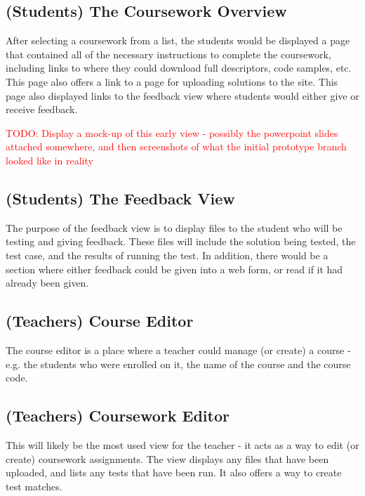 \documentclass[a4paper,11pt]{report}
\newcommand{\todo}[1]{\textcolor{red}{TODO: #1}}
\begin{document}
\subsection{(Students) The Coursework Overview}
After selecting a coursework from a list, the students would be displayed a page that contained all of the necessary instructions to complete the coursework, including links to where they could download full descriptors, code samples, etc. This page also offers a link to a page for uploading solutions to the site. This page also displayed links to the feedback view where students would either give or receive feedback.\par
\todo{Display a mock-up of this early view - possibly the powerpoint slides attached somewhere, and then screenshots of what the initial prototype branch looked like in reality}
\subsection{(Students) The Feedback View}
The purpose of the feedback view is to display files to the student who will be testing and giving feedback. These files will include the solution being tested, the test case, and the results of running the test. In addition, there would be a section where either feedback could be given into a web form, or read if it had already been given.
\subsection{(Teachers) Course Editor}
The course editor is a place where a teacher could manage (or create) a course - e.g. the students who were enrolled on it, the name of the course and the course code.
\subsection{(Teachers) Coursework Editor}
This will likely be the most used view for the teacher - it acts as a way to edit (or create) coursework assignments. The view displays any files that have been uploaded, and lists any tests that have been run. It also offers a way to create test matches.
\end{document}
